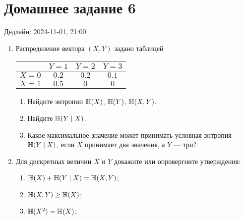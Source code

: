 \section*{Домашнее задание 6}


Дедлайн: 2024-11-01, 21:00.

\begin{enumerate}

\item Распределение вектора $(X, Y)$ задано таблицей

\begin{center}
    \begin{tabular}{lccc}
        \toprule
            & $Y = 1$  & $Y = 2$  & $Y = 3$ \\
        \midrule
        $X = 0$ & $0.2$  & $0.2$  & $0.1$ \\
        $X = 1$ & $0.5$  &  $0$   & $0$ \\
        \bottomrule
    \end{tabular}
\end{center}

\begin{enumerate}
    \item Найдите энтропии $\operatorname{\mathbb{H}}(X)$, $\operatorname{\mathbb{H}}(Y)$, $\operatorname{\mathbb{H}}(X, Y)$.
    \item Найдите $\operatorname{\mathbb{H}}(Y \mid X)$.
    \item Какое максимальное значение может принимать условная энтропия $\operatorname{\mathbb{H}}(Y \mid X)$, 
    если $X$ принимает два значения, а $Y$ — три?
\end{enumerate}


\item Для дискретных величин $X$ и $Y$ докажите или опровергните утверждения:
\begin{enumerate}
\item $\operatorname{\mathbb{H}}(X) + \operatorname{\mathbb{H}}(Y \mid X) = \operatorname{\mathbb{H}}(X, Y)$;
\item $\operatorname{\mathbb{H}}(X, Y) \geq \operatorname{\mathbb{H}}(X)$;
\item $\operatorname{\mathbb{H}}(X^2) = \operatorname{\mathbb{H}}(X)$;
\end{enumerate}


\end{enumerate}
